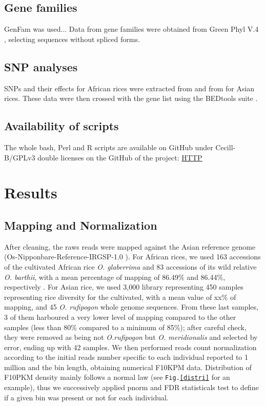 \documentclass[10pt,letterpaper]{article}
\begin{document}
\subsection*{Gene families}
GenFam was used...
Data from gene families were obtained from Green Phyl V.4 \cite{Conte2008b, Conte2008a, Rouard2011}, selecting sequences without spliced forms.

\subsection{SNP analyses}
SNPs and their effects for African rices were extracted from \cite{Cubry2018} and from \cite{3kRGP} for Asian rices. These data were then crossed with the gene list using the BEDtools suite \cite{Quinlan2014}.

\subsection*{Availability of scripts}
The whole bash, Perl and R scripts are available on GitHub under Cecill-B/GPLv3 double licenses on the GitHub of the project: \url{HTTP}

\section*{Results}
\subsection*{Mapping and Normalization}
After cleaning, the raws reads were mapped against the Asian reference genome (Os-Nipponbare-Reference-IRGSP-1.0 \cite{Mcnally2009, Kawahara2013}). For African rices, we used 163 accessions of the cultivated African rice \textit{O. glaberrima} and 83 accessions of its wild relative \textit{O. barthii}, with a mean percentage of mapping of 86.49\% and 86.44\%, respectively \cite{Cubry2018}. For Asian rice, we used 3,000 library representing 450 samples representing rice diversity for the cultivated, with a mean value of xx\% of mapping, and 45 \textit{O. rufipogon} whole genome sequences. From these last samples, 3 of them harboured a very lower level of mapping compared to the other samples (less than 80\% compared to a minimum of 85\%); after careful check, they were removed as being not \textit{O.rufipogon} but \textit{O. meridionalis} and selected by error, ending up with 42 samples. We then performed reads count normalization according to the initial reads number specific to each individual reported to 1 million and the bin length, obtaining numerical F10KPM data. Distribution of F10PKM density mainly follows a normal law (see \texttt{Fig.\ref{distri}} for an example), thus we successively applied pnorm and FDR statisticals test to define if a given bin was present or not for each individual.
\end{document}
